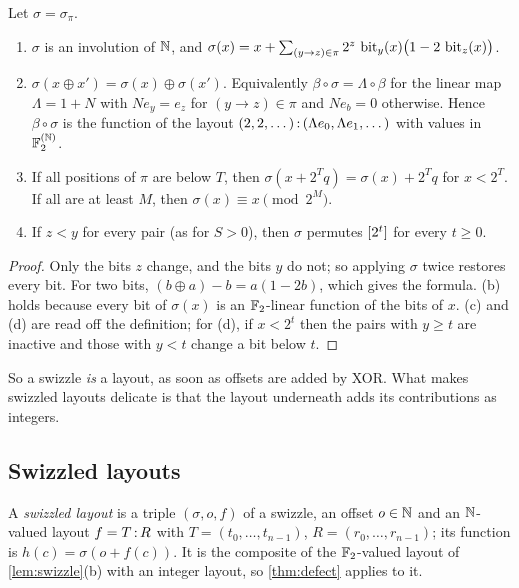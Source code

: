 \begin{lemma}\label{lem:swizzle}
Let $\sigma=\sigma_\pi$.
\begin{enumerate}[label=(\alph*),itemsep=1pt]
\item $\sigma$ is an involution of $\mathbb{N}$, and
 $\sigma(x)=x+\sum_{(y\to z)\in\pi}2^z\,\operatorname{bit}_y(x)\bigl(1-2\,\operatorname{bit}_z(x)\bigr)$.
\item $\sigma(x\oplus x')=\sigma(x)\oplus\sigma(x')$. Equivalently $\beta\circ\sigma=\Lambda\circ\beta$
 for the linear map $\Lambda=1+N$ with $Ne_y=e_z$ for $(y\to z)\in\pi$ and $Ne_b=0$ otherwise.
 Hence $\beta\circ\sigma$ is the function of the layout
 $(2,2,\dots)\,{:}\,(\Lambda e_0,\Lambda e_1,\dots)$ with values in $\mathbb{F}_2^{(\mathbb{N})}$.
\item If all positions of $\pi$ are below $T$, then $\sigma(x+2^Tq)=\sigma(x)+2^Tq$ for $x<2^T$.
 If all are at least $M$, then $\sigma(x)\equiv x\pmod{2^M}$.
\item If $z<y$ for every pair (as for $S>0$), then $\sigma$ permutes $[2^t]$ for every $t\ge0$.
\end{enumerate}
\end{lemma}
\begin{proof}
Only the bits $z$ change, and the bits $y$ do not; so applying $\sigma$ twice restores every bit.
For two bits, $(b\oplus a)-b=a(1-2b)$, which gives the formula. (b) holds because every bit of
$\sigma(x)$ is an $\mathbb{F}_2$-linear function of the bits of $x$. (c) and (d) are read off the
definition; for (d), if $x<2^t$ then the pairs with $y\ge t$ are inactive and those with $y<t$
change a bit below $t$.
\end{proof}

\noindent So a swizzle \emph{is} a layout, as soon as offsets are added by XOR. What makes
swizzled layouts delicate is that the layout underneath adds its contributions as integers.

\subsection{Swizzled layouts}

A \emph{swizzled layout} is a triple $(\sigma,o,f)$ of a swizzle, an offset $o\in\mathbb{N}$ and an
$\mathbb{N}$-valued layout $f=T\,{:}\,R$ with $T=(t_0,\dots,t_{n-1})$, $R=(r_0,\dots,r_{n-1})$; its function
is $h(c)=\sigma(o+f(c))$. It is the composite of the $\mathbb{F}_2$-valued layout of
\cref{lem:swizzle}(b) with an integer layout, so \cref{thm:defect} applies to it.


